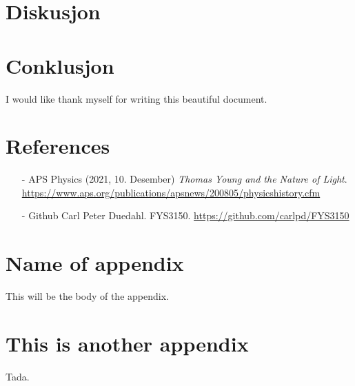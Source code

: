 \documentclass[reprint,english,notitlepage]{revtex4-2}  %
\begin{document}
\section{Diskusjon}
\section{Conklusjon}
\begin{acknowledgments}  %
I would like thank myself for writing this beautiful document.
\end{acknowledgments}


\section*{References}  %
\begin{itemize}
\item[-] APS Physics (2021, 10. Desember) \emph{Thomas Young and the Nature of Light}. \url{https://www.aps.org/publications/apsnews/200805/physicshistory.cfm}
\item[-] Github Carl Peter Duedahl. FYS3150. \url{https://github.com/carlpd/FYS3150}
\end{itemize}

\newpage
\appendix
\section{Name of appendix}
This will be the body of the appendix.
\section{This is another appendix}\label{appendix}
Tada.
\end{document}
